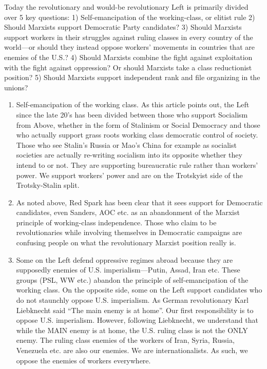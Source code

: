 Today the revolutionary and would-be revolutionary Left is primarily divided over 5 key questions: 1) Self-emancipation of the working-class, or elitist rule 2) Should Marxists support Democratic Party candidates? 3) Should Marxists support workers in their struggles against ruling classes in every country of the world---or should they instead oppose workers' movements in countries that are enemies of the U.S.? 4) Should Marxists combine the fight against exploitation with the fight against oppression? Or should Marxists take a class reductionist position? 5) Should Marxists support independent rank and file organizing in the unions?

\begin{enumerate}
\item Self-emancipation of the working class. As this article points out, the Left since the late 20's has been divided between those who support Socialism from Above, whether in the form of Stalinism or Social Democracy and those who actually support grass roots working class democratic control of society. Those who see Stalin's Russia or Mao's China for example as socialist societies are actually re-writing socialism into its opposite whether they intend to or not. They are supporting bureaucratic rule rather than workers' power. We support workers' power and are on the Trotskyist side of the Trotsky-Stalin split.
\item As noted above, Red Spark has been clear that it sees support for Democratic candidates, even Sanders, AOC etc. as an abandonment of the Marxist principle of working-class independence. Those who claim to be revolutionaries while involving themselves in Democratic campaigns are confusing people on what the revolutionary Marxist position really is.
\item Some on the Left defend oppressive regimes abroad because they are supposedly enemies of U.S. imperialism---Putin, Assad, Iran etc. These groups (PSL, WW etc.) abandon the principle of self-emancipation of the working class. On the opposite side, some on the Left support candidates who do not staunchly oppose U.S. imperialism. As German revolutionary Karl Liebknecht said ``The main enemy is at home''. Our first responsibility is to oppose U.S. imperialism. However, following Liebknecht, we understand that while the MAIN enemy is at home, the U.S. ruling class is not the ONLY enemy. The ruling class enemies of the workers of Iran, Syria, Russia, Venezuela etc. are also our enemies. We are internationalists. As such, we oppose the enemies of workers everywhere.

\end{enumerate}
